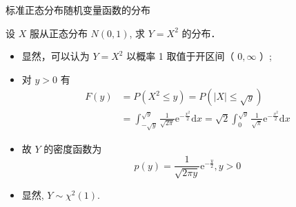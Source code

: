 \documentclass[Prob-All.tex]{subfiles}
\begin{document}
 \begin{frame}{标准正态分布随机变量函数的分布}
\begin{exam}
设 $X$ 服从正态分布 $N(0,1)$, 求 $Y=X^{2}$ 的分布．
\end{exam}
\pause

\jieda
\begin{itemize}[<+-|alert@+>]
\item 显然，可以认为 $Y=X^{2}$ 以概率 1 取值于开区间（ $0, \infty$ ）;
\item 对 $y>0$ 有
\begin{align*}
   F(y)&=P(X^2\leq y)=P(|X| \leqslant \sqrt{y})\\
   &=\int_{-\sqrt{y}}^{\sqrt{y}} \frac{1}{\sqrt{2 \pi}} \mathrm{e}^{-\frac{x^{2}}{2}} \mathrm{d} x=\sqrt{2} \int_{0}^{\sqrt{y}} \frac{1}{\sqrt{\pi}} \mathrm{e}^{-\frac{x^{2}}{2}} \mathrm{d} x
\end{align*}
\item 故 $Y$ 的密度函数为
\[
p(y)=\frac{1}{\sqrt{2 \pi y}} \mathrm{e}^{-\frac{y}{2}},  y>0
\]
\item 显然, $Y\sim \chi^2(1)$.
\end{itemize}


\end{frame}
%
%
%
%
\end{document}
